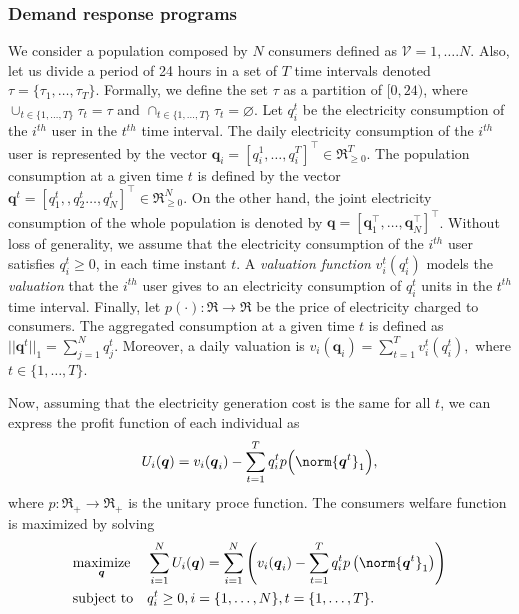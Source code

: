 \documentclass[a4paper,10pt]{article}
\def\th{^{th}}
\newcommand{\bs}[1]{\boldsymbol{#1}}
\begin{document}
\subsubsection{Demand response programs}



We consider a population composed by $N$ consumers defined as $\mathcal{V} = {1,\ldots.N}$. Also, let us divide a period of 24 hours in a set of $T$ time intervals denoted $\tau = \{\tau_1,\ldots,\tau_T\}$.
Formally, we define the set $\tau$ as a partition of $[0,24)$, where 
 $\cup_{t\in\{1,\ldots,T\}} \tau_t = \tau$ and $\cap_{t\in\{1,\ldots,T\}} \tau_t = \varnothing$.
%
Let $q_i^t$ be the electricity consumption of the $i\th$ user in the $t\th$ time interval. 
The daily electricity consumption of the $i\th$ user is represented by the vector $\bs{q}_i=[q_i^1,\ldots,q_i^T]^\top\in \Re_{\geq 0}^{T}$.
The population consumption at a given time $t$ is defined by the vector $\bs{q}^t = [q_1^t,, q_2^t\ldots,q_N^t]^\top\in \Re_{\geq 0}^{N}$.
On the other hand, the joint electricity consumption of the whole population is denoted by $\bs{q} = [\bs{q}_1^\top,
\ldots, \bs{q}_N^\top]^\top$. 
Without loss of generality, we assume that the electricity consumption of the $i\th$ user  satisfies $q_i^t\geq 0$,  in each time instant $t$.
A \emph{valuation function} $v_i^t(q_i^t)$ models the \emph{valuation} that the $i\th$ user gives to an electricity consumption of $q_i^t$ units in the $t\th$ time interval. Finally, let $p(\cdot):\Re\rightarrow\Re$ be the price of electricity charged to consumers. The aggregated consumption at a given time $t$ is defined as $||\bs{q}^t||_1 = \sum_{j=1}^N q_j^t$.
Moreover, a daily valuation is 
$v_i(\bs{q}_i)=\sum_{t=1}^T v_i^t(q_i^t),$
 where $t\in\{1,\ldots,T\}$.


 
 
 
Now, assuming  that the electricity generation cost is  the same for all $t$, we can express the profit function of each individual as
%
\begin{equation}\label{eq:u_i_}
 U_i(\bs{q}) = v_i(\bs{q}_i) - \sum_{t=1}^T q_i^t p\Big( \norm{\bs{q}^t}_1 \Big),
\end{equation}
%
where 
$p:\Re_+ \to \Re_+$ is the unitary proce function.
The consumers welfare function is maximized by solving \cite{Johari09}
%
\begin{equation}\label{eq:opt_problem}
\begin{aligned}
& \underset{\bs{q}}{\text{maximize}}
& &  \sum_{i=1}^N U_i(\bs{q}) =  \sum_{i=1}^N\left( v_i(\bs{q}_i) - \sum_{t=1}^T q_i^t p\left( \norm{\bs{q}^t}_1 \right) \right) \\
& \text{subject to}
& & q_i^t \geq 0,  i =\{1,\ldots,N\}, t =\{1,\ldots,T\}.
\end{aligned}
\end{equation}
\end{document}

